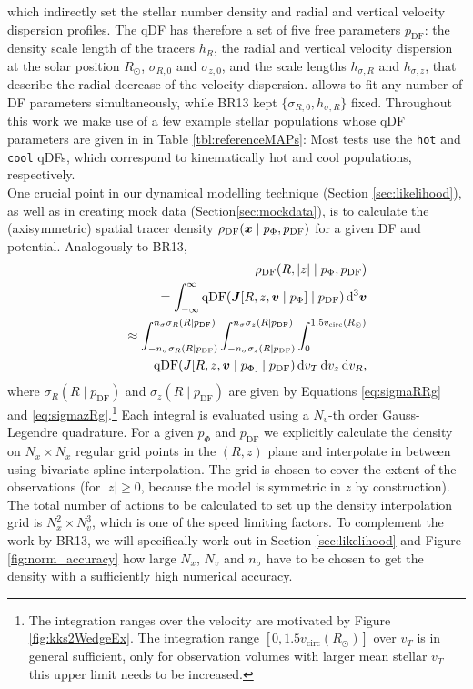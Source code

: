 which indirectly set the stellar number density and radial and vertical velocity dispersion profiles. The qDF has therefore a set of five free parameters $p_\text{DF}$: the density scale length of the tracers $h_R$, the radial and vertical velocity dispersion at the solar position $R_\odot$, $\sigma_{R,0}$ and $\sigma_{z,0}$, and the scale lengths $h_{\sigma,R}$ and $h_{\sigma,z}$, that describe the radial decrease of the velocity dispersion. \RM{} allows to fit any number of DF parameters simultaneously, while BR13 kept $\{\sigma_{R,0},h_{\sigma,R}\}$ fixed. Throughout this work we make use of a few example stellar populations whose qDF parameters are given in in Table \ref{tbl:referenceMAPs}: Most tests use the \texttt{hot} and \texttt{cool} qDFs, which correspond to kinematically hot and cool populations, respectively.\\

One crucial point in our dynamical modelling technique (Section \ref{sec:likelihood}), as well as in creating mock data (Section\ref{sec:mockdata}), is to calculate the (axisymmetric) spatial tracer density $\rho_\text{DF}(\boldsymbol{x} \mid p_{\Phi},p_\text{DF})$ for a given DF and potential. Analogously to BR13, 
\begin{eqnarray}
&&\rho_\text{DF}(R,|z| \mid p_{\Phi},p_\text{DF}) \nonumber\\
&&= \int_{-\infty}^{\infty} \text{qDF}(\vect{J}[R,z,\vect{v} \mid p_{\Phi}] \mid p_\text{DF}) \Diff3\vect{v}  \\%
&&\approx \int_{-n_\sigma \sigma_R(R \mid p_\text{DF})}^{n_\sigma \sigma_R(R \mid p_\text{DF})} \int_{-n_\sigma\sigma_z(R \mid p_\text{DF})}^{n_\sigma \sigma_z(R \mid p_\text{DF})} \int_{0}^{1.5 v_\text{circ}(R_\odot)}  \nonumber\\
& & \hspace{1cm} \text{qDF}(J[R,z,\vect{v} \mid p_{\Phi}] \mid p_\text{DF}) \diff v_T \diff v_z \diff v_R, \label{eq:tracerdensity}
\end{eqnarray}
where $\sigma_R(R \mid p_\text{DF})$ and $\sigma_z(R \mid p_\text{DF})$ are given by Equations \ref{eq:sigmaRRg} and \ref{eq:sigmazRg}.\footnote{The integration ranges over the velocity are motivated by Figure \ref{fig:kks2WedgeEx}. The integration range $[0,1.5 v_\text{circ}(R_\odot)]$ over $v_T$ is in general sufficient, only for observation volumes with larger mean stellar $v_T$ this upper limit needs to be increased.} Each integral is evaluated using a $N_v$-th order Gauss-Legendre quadrature. For a given $p_\Phi$ and $p_\text{DF}$ we explicitly calculate the density on $N_x \times N_x$ regular grid points in the $(R,z)$ plane and interpolate in between using bivariate spline interpolation. The grid is chosen to cover the extent of the observations (for $|z|\geq0$, because the model is symmetric in $z$ by construction). The total number of actions to be calculated to set up the density interpolation grid is $N_x^2 \times N_v^3$, which is one of the speed limiting factors. To complement the work by BR13, we will specifically work out in Section \ref{sec:likelihood} and Figure \ref{fig:norm_accuracy} how large $N_x$, $N_v$ and $n_\sigma$ have to be chosen to get the density with a sufficiently high numerical accuracy. 

